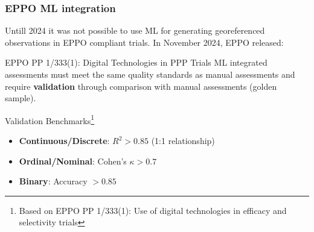 \documentclass[aspectratio=43]{beamer}
\begin{document}
\begin{frame}
    \frametitle{\small EPPO ML integration}
    \small Untill 2024 it was not possible to use ML for generating georeferenced observations in EPPO compliant trials.
    \vspace{0.3cm}
    In November 2024, EPPO released:
    \begin{block}{EPPO PP 1/333(1): Digital Technologies in PPP Trials}
        \small
        ML integrated assessments must meet the same quality standards as manual assessments and require \textbf{validation} through comparison with manual assessments (golden sample).
    \end{block}
    
    \begin{exampleblock}{Validation Benchmarks\footnote{\tiny Based on EPPO PP 1/333(1): Use of digital technologies in efficacy and selectivity trials}}
        \scriptsize
        \begin{itemize}
            \item \textbf{\large Continuous/Discrete}\large : $R^2 > 0.85$ (1:1 relationship)
            \item \textbf{\large Ordinal/Nominal}\large : Cohen's $\kappa > 0.7$
            \item \textbf{\large Binary}\large : Accuracy $> 0.85$
        \end{itemize}
    \end{exampleblock}
\end{frame}
\end{document}
